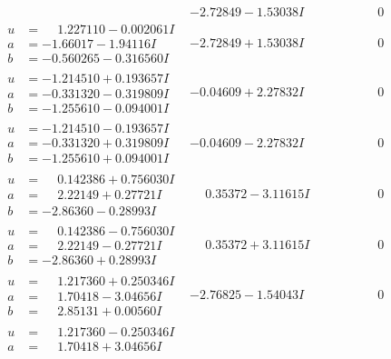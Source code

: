 \documentclass[1p]{elsarticle_modified}
\theoremstyle{definition}
\begin{document}
$$\begin{array}{c|c|c}
 & -2.72849 - 1.53038 I & \phantom{-0.000000 } 0 \\ \hline\begin{aligned}
u &= \phantom{-}1.227110 - 0.002061 I \\
a &= -1.66017 - 1.94116 I \\
b &= -0.560265 - 0.316560 I\end{aligned}
 & -2.72849 + 1.53038 I & \phantom{-0.000000 } 0 \\ \hline\begin{aligned}
u &= -1.214510 + 0.193657 I \\
a &= -0.331320 - 0.319809 I \\
b &= -1.255610 - 0.094001 I\end{aligned}
 & -0.04609 + 2.27832 I & \phantom{-0.000000 } 0 \\ \hline\begin{aligned}
u &= -1.214510 - 0.193657 I \\
a &= -0.331320 + 0.319809 I \\
b &= -1.255610 + 0.094001 I\end{aligned}
 & -0.04609 - 2.27832 I & \phantom{-0.000000 } 0 \\ \hline\begin{aligned}
u &= \phantom{-}0.142386 + 0.756030 I \\
a &= \phantom{-}2.22149 + 0.27721 I \\
b &= -2.86360 - 0.28993 I\end{aligned}
 & \phantom{-}0.35372 - 3.11615 I & \phantom{-0.000000 } 0 \\ \hline\begin{aligned}
u &= \phantom{-}0.142386 - 0.756030 I \\
a &= \phantom{-}2.22149 - 0.27721 I \\
b &= -2.86360 + 0.28993 I\end{aligned}
 & \phantom{-}0.35372 + 3.11615 I & \phantom{-0.000000 } 0 \\ \hline\begin{aligned}
u &= \phantom{-}1.217360 + 0.250346 I \\
a &= \phantom{-}1.70418 - 3.04656 I \\
b &= \phantom{-}2.85131 + 0.00560 I\end{aligned}
 & -2.76825 - 1.54043 I & \phantom{-0.000000 } 0 \\ \hline\begin{aligned}
u &= \phantom{-}1.217360 - 0.250346 I \\
a &= \phantom{-}1.70418 + 3.04656 I \\

\end{aligned}
\end{array}$$
\end{document}
